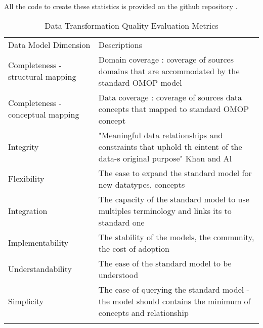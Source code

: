 All the code to create these statistics is provided on the github repository 
\cite{mimic-omop-website}.

\tiny
\begin{table*}[t]
\caption{Data Transformation Quality Evaluation Metrics}
\begin{tabular}{@{}ll@{}}\toprule
Data Model Dimension              & Descriptions                                                                                                      \\\colrule
Completeness - structural mapping & Domain coverage : coverage of sources domains that are accommodated by the standard OMOP model                    \\
Completeness - conceptual mapping & Data coverage : coverage of sources data concepts that mapped to standard OMOP concept                           \\
Integrity                         & "Meaningful data relationships and constraints that uphold th eintent of the data-s original purpose" Khan and Al \\
Flexibility                       & The ease to expand the standard model for new datatypes, concepts                                                 \\
Integration                       & The capacity of the standard model to use multiples terminology and links its to standard one                     \\
Implementability                  & The stability of the models, the community, the cost of adoption                                                  \\
Understandability                 & The ease of the standard model to be understood                                                           	      \\
Simplicity                        & The ease of querying the standard model - the model should contains the minimum of concepts and relationship    \\\botrule 
\end{tabular}
\label{table:quality}
\end{table*}
\normalsize


